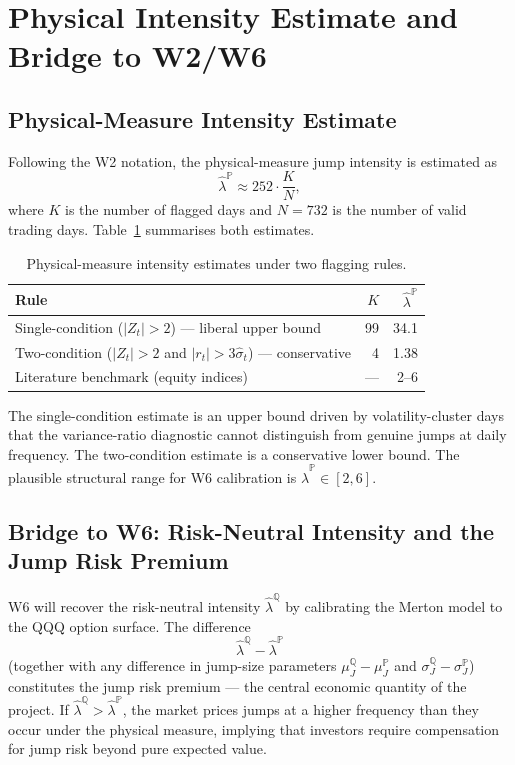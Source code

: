 \documentclass[11pt,a4paper]{article}
\begin{document}
\section{Physical Intensity Estimate and Bridge to W2/W6}

\subsection{Physical-Measure Intensity Estimate}

Following the W2 notation, the physical-measure jump intensity is estimated as
\[
\hat{\lambda}^{\mathbb{P}} \approx 252 \cdot \frac{K}{N},
\]
where $K$ is the number of flagged days and $N=732$ is the number of valid trading days. Table~\ref{tab:intensity} summarises both estimates.

\begin{table}[H]
\centering
\caption{Physical-measure intensity estimates under two flagging rules.}
\label{tab:intensity}
\begin{tabular}{lrr}
\toprule
Rule & $K$ & $\hat{\lambda}^{\mathbb{P}}$ \\
\midrule
Single-condition ($|Z_t|>2$) --- liberal upper bound & 99 & 34.1 \\
Two-condition ($|Z_t|>2$ and $|r_t|>3\hat{\sigma}_t$) --- conservative & 4 & 1.38 \\
Literature benchmark (equity indices) & --- & 2--6 \\
\bottomrule
\end{tabular}
\end{table}

The single-condition estimate is an upper bound driven by volatility-cluster days that the variance-ratio diagnostic cannot distinguish from genuine jumps at daily frequency. The two-condition estimate is a conservative lower bound. The plausible structural range for W6 calibration is $\hat{\lambda}^{\mathbb{P}}\in[2,6]$.

\subsection{Bridge to W6: Risk-Neutral Intensity and the Jump Risk Premium}

W6 will recover the risk-neutral intensity $\hat{\lambda}^{\mathbb{Q}}$ by calibrating the Merton model to the QQQ option surface. The difference
\[
\hat{\lambda}^{\mathbb{Q}}-\hat{\lambda}^{\mathbb{P}}
\]
(together with any difference in jump-size parameters
$\mu_J^{\mathbb{Q}}-\mu_J^{\mathbb{P}}$ and
$\sigma_J^{\mathbb{Q}}-\sigma_J^{\mathbb{P}}$) constitutes the jump risk premium --- the central economic quantity of the project. If $\hat{\lambda}^{\mathbb{Q}}>\hat{\lambda}^{\mathbb{P}}$, the market prices jumps at a higher frequency than they occur under the physical measure, implying that investors require compensation for jump risk beyond pure expected value.
\end{document}
